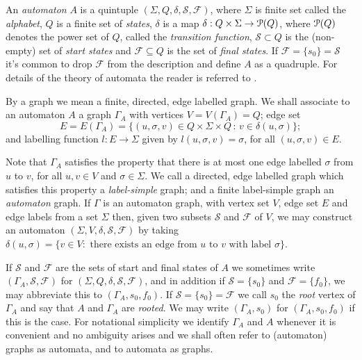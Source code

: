 \documentclass[a4paper,12pt]{article}
\newcommand{\G}{\Gamma }
\renewcommand{\d}{\delta }
\newcommand{\s}{\sigma }
\renewcommand{\S}{\Sigma }
\newcommand{\cF}{{\cal{F}}}
\newcommand{\cP}{{\cal{P}}}
\newcommand{\cS}{{\cal{S}}}
\numberwithin{equation}{section}
\numberwithin{figure}{section}
\renewcommand{\cF}{\mathcal{F}}
\renewcommand{\cS}{\mathcal{S}}
\newcommand{\maps}{\rightarrow}
\begin{document}
An {\em automaton} $A$ is  a quintuple
$(\S,Q,\d,\mathcal{S},\mathcal{F})$, where $\S$ is finite set
called the {\em alphabet}, $Q$ is a finite set of {\em states},
$\d$ is a map $\d:Q\times \S\maps \cP(Q)$,  where $\cP(Q)$ denotes
 the power set of $Q$, called the {\em transition
function}, $\mathcal{S}\subset Q$ is the (non-empty) set of {\em
start states} and $\mathcal{F}\subseteq Q$ is the set of {\em
final states}.  If
$\mathcal{F}=\{s_0\}=\mathcal{S}$ it's common to drop
$\mathcal{F}$ from the description and define $A$ as a quadruple.
For details of the theory of automata the reader is referred to
 \cite{Lawson04}.

By a graph we mean a finite, directed, edge labelled graph.
We shall associate to an automaton $A$
a graph $\G_A$ with vertices
$V=V(\G_A)=Q$; edge set 
\[E=E(\G_A)=\{(u,\s,v)\in Q\times \S\times Q\,:\, v\in \d(u,\s)\};\] 
and
labelling function $l:E\maps \S$ given by $l(u,\s,v)=\s$, for all
$(u,\s,v) \in E$.  

Note that $\G_A$ satisfies the property  that 
there is at most one
edge labelled $\s$ from $u$ to $v$, %
for all $u,v\in V$ and $\s\in \S$.
We call a directed, edge labelled graph which satisfies this
property a \emph{label-simple} graph; and a finite label-simple 
graph an \emph{automaton} graph.  
 If $\G$ is an automaton graph,  
 with vertex set 
$V$, edge set $E$ and edge labels from a set $\S$ then, given 
two subsets $\cS$ and $\cF$ of $V$,  we may construct an automaton
$(\S,V,\d,\cS,\cF)$ by taking $\d(u,\s)=\{v\in V: \textrm{ there exists an edge 
from } u \textrm{ to } v \textrm{ with label } \s\}$.
 

If $\mathcal{S}$ and $\mathcal{F}$ are the sets
of start and final states of $A$ we sometimes write
$(\G_A,\mathcal{S},\mathcal{F})$ for
$(\S,Q,\d,\mathcal{S},\mathcal{F})$, and in addition if
$\mathcal{S}=\{s_0\}$ and $\mathcal{F}=\{f_0\}$, we may abbreviate
this to $(\G_A,s_0,f_0)$. If $\mathcal{S}=\{s_0\}=\mathcal{F}$
we
call $s_0$ the {\em root}
vertex of $\G_A$ and say that $A$ and $\G_A$ are {\em rooted}. We may
 write $(\G_A,s_0)$ for $(\G_A,s_0,f_0)$ if this is the case.
For notational simplicity we identify $\G_A$
and $A$ whenever it is convenient and no ambiguity arises
and we shall often refer to  (automaton) graphs as automata, and
to automata as graphs.
\end{document}

